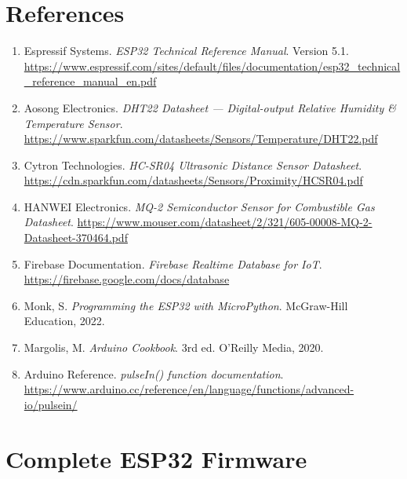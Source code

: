 \documentclass[12pt,a4paper]{article}
\begin{document}
\newpage

\section{References}

\begin{enumerate}[leftmargin=1.5cm]
  \item Espressif Systems. \textit{ESP32 Technical Reference Manual}. Version 5.1. \url{https://www.espressif.com/sites/default/files/documentation/esp32_technical_reference_manual_en.pdf}
  
  \item Aosong Electronics. \textit{DHT22 Datasheet — Digital-output Relative Humidity \& Temperature Sensor}. \url{https://www.sparkfun.com/datasheets/Sensors/Temperature/DHT22.pdf}
  
  \item Cytron Technologies. \textit{HC-SR04 Ultrasonic Distance Sensor Datasheet}. \url{https://cdn.sparkfun.com/datasheets/Sensors/Proximity/HCSR04.pdf}
  
  \item HANWEI Electronics. \textit{MQ-2 Semiconductor Sensor for Combustible Gas Datasheet}. \url{https://www.mouser.com/datasheet/2/321/605-00008-MQ-2-Datasheet-370464.pdf}
  
  \item Firebase Documentation. \textit{Firebase Realtime Database for IoT}. \url{https://firebase.google.com/docs/database}
  
  \item Monk, S. \textit{Programming the ESP32 with MicroPython}. McGraw-Hill Education, 2022.
  
  \item Margolis, M. \textit{Arduino Cookbook}. 3rd ed. O'Reilly Media, 2020.
  
  \item Arduino Reference. \textit{pulseIn() function documentation}. \url{https://www.arduino.cc/reference/en/language/functions/advanced-io/pulsein/}
\end{enumerate}

\newpage

\appendix
\section{Complete ESP32 Firmware}
\end{document}
